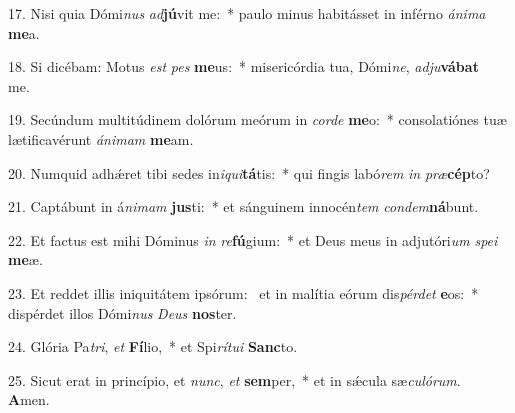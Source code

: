 17. Nisi quia Dómi\textit{nus} \textit{ad}\textbf{jú}vit me:~*  paulo minus habitásset in inférno \textit{á}\textit{ni}\textit{ma} \textbf{me}a.\

18. Si dicébam: Motus \textit{est} \textit{pes} \textbf{me}us:~*  misericórdia tua, Dómi\textit{ne}, \textit{ad}\textit{ju}\textbf{vá}\textbf{bat} me.\

19. Secúndum multitúdinem dolórum meórum in \textit{cor}\textit{de} \textbf{me}o:~*  consolatiónes tuæ lætificavérunt \textit{á}\textit{ni}\textit{mam} \textbf{me}am.\

20. Numquid adhǽret tibi sedes in\textit{i}\textit{qui}\textbf{tá}tis:~*  qui fingis labó\textit{rem} \textit{in} \textit{præ}\textbf{cép}to?\

21. Captábunt in á\textit{ni}\textit{mam} \textbf{jus}ti:~*  et sánguinem innocén\textit{tem} \textit{con}\textit{dem}\textbf{ná}bunt.\

22. Et factus est mihi Dóminus \textit{in} \textit{re}\textbf{fú}gium:~*  et Deus meus in adjutóri\textit{um} \textit{spe}\textit{i} \textbf{me}æ.\

23. Et reddet illis iniquitátem ipsórum: \dag\  et in malítia eórum dis\textit{pér}\textit{det} \textbf{e}os:~*  dispérdet illos Dómi\textit{nus} \textit{De}\textit{us} \textbf{nos}ter.\

24. Glória Pa\textit{tri}, \textit{et} \textbf{Fí}lio,~*  et Spi\textit{rí}\textit{tu}\textit{i} \textbf{Sanc}to.\

25. Sicut erat in princípio, et \textit{nunc}, \textit{et} \textbf{sem}per,~*  et in sǽcula sæ\textit{cu}\textit{ló}\textit{rum}. \textbf{A}men.\

